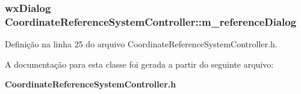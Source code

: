 \subsubsection[{m\+\_\+reference\+Dialog}]{\setlength{\rightskip}{0pt plus 5cm}wx\+Dialog Coordinate\+Reference\+System\+Controller\+::m\+\_\+reference\+Dialog\hspace{0.3cm}{\ttfamily [protected]}}\label{class_coordinate_reference_system_controller_af7c125e95567a043d3a09d0f96f5f72a}


Definição na linha 25 do arquivo Coordinate\+Reference\+System\+Controller.\+h.



A documentação para esta classe foi gerada a partir do seguinte arquivo\+:\begin{DoxyCompactItemize}
\item 
{\bf Coordinate\+Reference\+System\+Controller.\+h}\end{DoxyCompactItemize}
